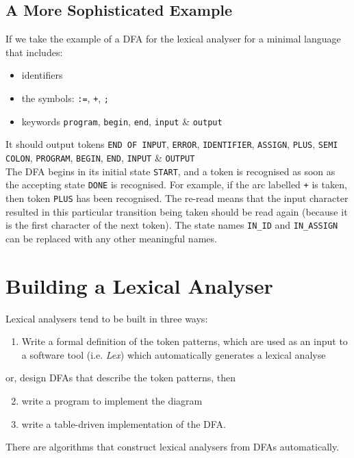 \subsection{A More Sophisticated Example}
If we take the example of a DFA for the lexical analyser for a minimal language that includes:
\begin{itemize}
    \item identifiers
    \item the symbols: \verb|:=|, \verb|+|, \verb|;|
    \item keywords \verb|program|, \verb|begin|, \verb|end|, \verb|input| \& \verb|output|
\end{itemize}

It should output tokens \verb|END OF INPUT|, \verb|ERROR|, \verb|IDENTIFIER|, \verb|ASSIGN|, \verb|PLUS|, \verb|SEMI COLON|, \verb|PROGRAM|, \verb|BEGIN|, \verb|END|, \verb|INPUT| \& \verb|OUTPUT|\\


The DFA begins in its initial state \verb|START|, and a token is recognised as soon as the accepting state \verb|DONE| is recognised. For example, if the arc labelled \verb|+| is taken, then token \verb|PLUS| has been  recognised. The re-read means that the input character resulted in this particular transition being taken should be read again (because it is the first character of the next token). The state names \verb|IN_ID| and \verb|IN_ASSIGN| can be replaced with any other meaningful names. 

\section{Building a Lexical Analyser}
Lexical analysers tend to be built in three ways:
\begin{enumerate}
    \item Write a formal definition of the token patterns, which are used as an input to a software tool (i.e. \textit{Lex}) which automatically generates a lexical analyse 
\end{enumerate}
or, design DFAs that describe the token patterns, then
\begin{enumerate}
    \setcounter{enumi}{1}
    \item write a program to implement the diagram
    \item write a table-driven implementation of the DFA.
\end{enumerate}
There are algorithms that construct lexical analysers from DFAs automatically.

